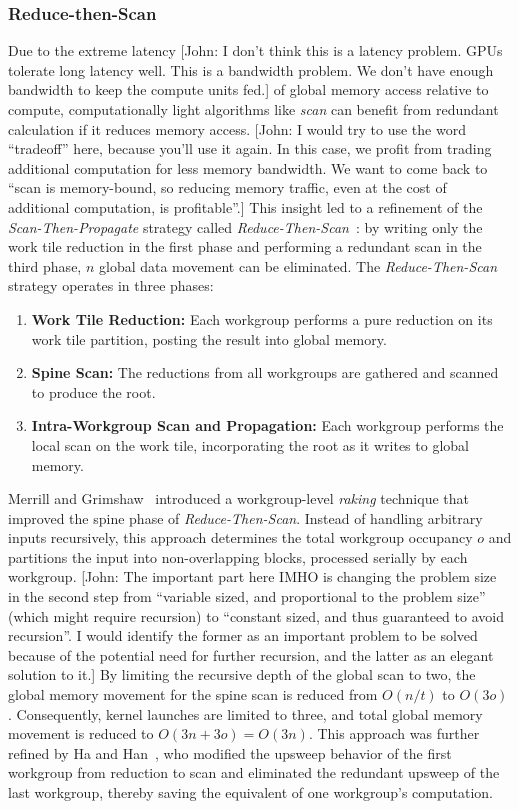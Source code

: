 \documentclass[sigconf]{acmart}
\newcommand{\john}[1]{{\footnotesize\color{cyan}[John: #1]}}
\begin{document}
\subsubsection{Reduce-then-Scan}
Due to the extreme latency \john{I don't think this is a latency problem. GPUs tolerate long latency well. This is a bandwidth problem. We don't have enough bandwidth to keep the compute units fed.} of global memory access relative to compute, computationally light algorithms like \emph{scan} can benefit from redundant calculation if it reduces memory access. \john{I would try to use the word ``tradeoff'' here, because you'll use it again. In this case, we profit from trading additional computation for less memory bandwidth. We want to come back to ``scan is memory-bound, so reducing memory traffic, even at the cost of additional computation, is profitable''.} This insight led to a refinement of the \emph{Scan-Then-Propagate} strategy called \emph{Reduce-Then-Scan}~\cite{Merrill-Grimshaw, Ha-and-Han, Dotsenko, Breitbart}: by writing only the work tile reduction in the first phase and performing a redundant scan in the third phase, $n$ global data movement can be eliminated. The \emph{Reduce-Then-Scan} strategy operates in three phases:
\begin{enumerate}
  \item \textbf{Work Tile Reduction:} Each workgroup performs a pure reduction on its work tile partition, posting the result into global memory.
  \item \textbf{Spine Scan:} The reductions from all workgroups are gathered and scanned to produce the root.
  \item \textbf{Intra-Workgroup Scan and Propagation:} Each workgroup performs the local scan on the work tile, incorporating the root as it writes to global memory.
\end{enumerate}
Merrill and Grimshaw~\cite{} introduced a workgroup-level \emph{raking} technique that improved the spine phase of \emph{Reduce-Then-Scan}. Instead of handling arbitrary inputs recursively, this approach determines the total workgroup occupancy $o$ and partitions the input into non-overlapping blocks, processed serially by each workgroup. \john{The important part here IMHO is changing the problem size in the second step from ``variable sized, and proportional to the problem size'' (which might require recursion) to ``constant sized, and thus guaranteed to avoid recursion''. I would identify the former as an important problem to be solved because of the potential need for further recursion, and the latter as an elegant solution to it.} By limiting the recursive depth of the global scan to two, the global memory movement for the spine scan is reduced from $O(n/t)$ to $O(3o)$. Consequently, kernel launches are limited to three, and total global memory movement is reduced to $O(3n + 3o) = O(3n)$. This approach was further refined by Ha and Han~\cite{}, who modified the upsweep behavior of the first workgroup from reduction to scan and eliminated the redundant upsweep of the last workgroup, thereby saving the equivalent of one workgroup's computation.
\end{document}
